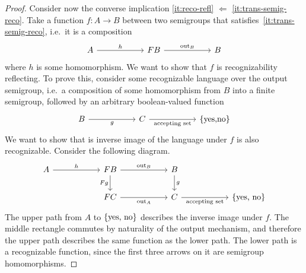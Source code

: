 \begin{proof}
Consider now the converse implication \ref{it:reco-refl} $\Leftarrow$ \ref{it:trans-semig-reco}. Take a function $f : A \to B$ between two semigroups that satisfies~\ref{it:trans-semig-reco}, i.e.~it is a composition 
\[\begin{tikzcd}
    [column sep=2cm]
	A & {\functor B} & B 
	\arrow["h", from=1-1, to=1-2]
	\arrow["\outfun_{B}", from=1-2, to=1-3]
\end{tikzcd}\]
where $h$ is some homomorphism. We want to show that $f$ is recognizability reflecting. To prove this, consider some recognizable language over the output semigroup, i.e.~a composition of some homomorphism from $B$ into a finite semigroup, followed by an arbitrary boolean-valued function
\[
\begin{tikzcd}
    [column sep=2cm]
B 
\ar[r,"g"']
&
C
\ar[r,"\text{accepting set}"']
&
\set{\text{yes,no}}
\end{tikzcd}
\]
We want to show that is inverse image of the language under $f$ is also recognizable. Consider the following diagram. 
\[\begin{tikzcd}
    [column sep=2cm]
	A & {\functor B} & B \\
	& {\functor C} & C & \set{\text{yes, no}}
	\arrow["h", from=1-1, to=1-2]
	\arrow["\outfun_B", from=1-2, to=1-3]
	\arrow["{\functor g}"', from=1-2, to=2-2]
	\arrow["\outfun_A"', from=2-2, to=2-3]
	\arrow["g", from=1-3, to=2-3]
	\arrow["\text{accepting set}"', from=2-3, to=2-4]
\end{tikzcd}\]
The upper path from $A$ to $\{\text{yes, no}\}$ describes the inverse image under $f$. 
 The middle rectangle commutes by naturality of the output mechanism, and therefore the upper path describes the same function as the lower path. The lower path is a recognizable function, since the first three arrows on it are semigroup homomorphisms.
\end{proof}


